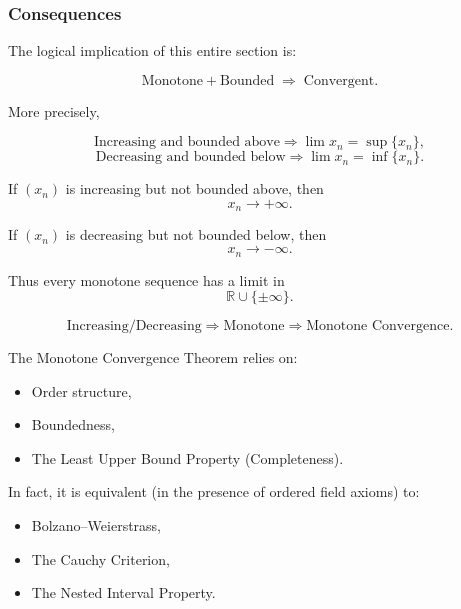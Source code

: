 \subsubsection{Consequences}

The logical implication of this entire section is:

\[
\text{Monotone} + \text{Bounded}
\;\Rightarrow\;
\text{Convergent}.
\]

More precisely,

\[
\text{Increasing and bounded above}
\Rightarrow
\lim x_n = \sup\{x_n\},
\]
\[
\text{Decreasing and bounded below}
\Rightarrow
\lim x_n = \inf\{x_n\}.
\]

\begin{remark}
If $(x_n)$ is increasing but not bounded above, then
\[
x_n \to +\infty.
\]

If $(x_n)$ is decreasing but not bounded below, then
\[
x_n \to -\infty.
\]

Thus every monotone sequence has a limit in
\[
\mathbb{R} \cup \{\pm\infty\}.
\]
\end{remark}

\begin{remark}
\[
\text{Increasing/Decreasing}
\Rightarrow
\text{Monotone}
\Rightarrow
\text{Monotone Convergence}.
\]

The Monotone Convergence Theorem relies on:

\begin{itemize}
\item Order structure,
\item Boundedness,
\item The Least Upper Bound Property (Completeness).
\end{itemize}

In fact, it is equivalent (in the presence of ordered field axioms) to:

\begin{itemize}
\item Bolzano--Weierstrass,
\item The Cauchy Criterion,
\item The Nested Interval Property.
\end{itemize}
\end{remark}
